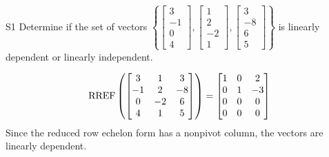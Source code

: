 \documentclass{sbgLAquiz}
\begin{document}
\begin{problem}{S1} 
Determine if the set of vectors $\left\{\begin{bmatrix} 3 \\ -1 \\ 0 \\ 4 \end{bmatrix}, \begin{bmatrix} 1  \\ 2 \\ -2 \\ 1 \end{bmatrix}, \begin{bmatrix} 3 \\ -8 \\ 6 \\ 5 \end{bmatrix} \right\}$  is linearly dependent or linearly independent.
\end{problem}
\begin{solution}
$$\operatorname{RREF}\left(\begin{bmatrix} 3 & 1 & 3 \\ -1 & 2 & -8 \\ 0 & -2 & 6 \\ 4 & 1 & 5 \end{bmatrix} \right) = \begin{bmatrix} 1 & 0 & 2 \\ 0 & 1 & -3 \\ 0 & 0 & 0 \\ 0 & 0 & 0 \end{bmatrix}$$
Since the reduced row echelon form has a nonpivot column, the vectors are linearly dependent.
\end{solution}
\end{document}
